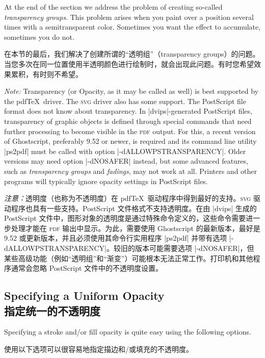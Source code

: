 At the end of the section we address the problem of creating so-called
\emph{transparency groups}. This problem arises when you paint over a position
several times with a semitransparent color. Sometimes you want the effect to
accumulate, sometimes you do not.

在本节的最后，我们解决了创建所谓的“透明组”（transparency groups）的问题。当您多次在同一位置使用半透明颜色进行绘制时，就会出现此问题。有时您希望效果累积，有时则不希望。

\emph{Note:} Transparency (or Opacity, as it may be called as well) is best
supported by the pdf\TeX\ driver. The \textsc{svg} driver also has some
support. The PostScript file format does not know about transparency. In
|dvips|-generated PostScript files, transparency of graphic objects is defined
through special commands that need further processing to become visible in the
\textsc{pdf} output. For this, a recent version of Ghostscript, preferably 9.52
or newer, is required and its command line utility |ps2pdf| must be called with
option |-dALLOWPSTRANSPARENCY|. Older versions may need option |-dNOSAFER|
instead, but some advanced features, such as \emph{transparency groups} and
\emph{fadings}, may not work at all. Printers and other programs will typically
ignore opacity settings in PostScript files.

\emph{注意：}透明度（也称为不透明度）在 pdf\TeX\ 驱动程序中得到最好的支持。\textsc{svg} 驱动程序也具有一些支持。PostScript 文件格式不支持透明度。在由 |dvips| 生成的 PostScript 文件中，图形对象的透明度是通过特殊命令定义的，这些命令需要进一步处理才能在 \textsc{pdf} 输出中显示。为此，需要使用 Ghostscript 的最新版本，最好是 9.52 或更新版本，并且必须使用其命令行实用程序 |ps2pdf| 并带有选项 |-dALLOWPSTRANSPARENCY|。较旧的版本可能需要选项 |-dNOSAFER|，但某些高级功能（例如“透明组”和“渐变”）可能根本无法正常工作。打印机和其他程序通常会忽略 PostScript 文件中的不透明度设置。


\subsection{Specifying a Uniform Opacity\\指定统一的不透明度}

Specifying a stroke and/or fill opacity is quite easy using the following
options.

使用以下选项可以很容易地指定描边和/或填充的不透明度。

